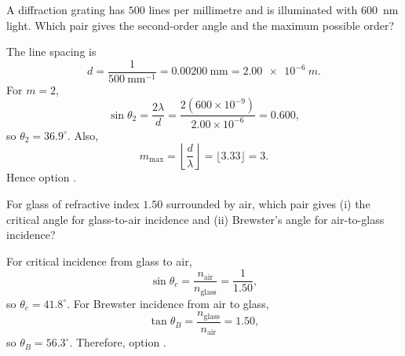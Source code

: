 \begin{quizquestion}[
  id=phy104-opt-038,
  topic=optics,
  difficulty=applied,
  marks=2,
  correct=D,
  tags={diffraction-grating,grating-equation,order-limit},
  outcome={Combine a grating angle calculation with the order limit}
]
  A diffraction grating has \(500\) lines per millimetre and is illuminated with \SI{600}{nm} light. Which pair gives the second-order angle and the maximum possible order?
\end{quizquestion}
\begin{quizsolution}
  The line spacing is
    \[
      d=\frac{1}{500\ \mathrm{mm}^{-1}}=0.00200\ \mathrm{mm}=\SI{2.00e-6}{m}.
    \]
    For \(m=2\),
    \[
      \sin\theta_2=\frac{2\lambda}{d}
      =\frac{2(600\times10^{-9})}{2.00\times10^{-6}}=0.600,
    \]
    so \(\theta_2=36.9^\circ\). Also,
    \[
      m_{\max}=\left\lfloor\frac{d}{\lambda}\right\rfloor
      =\lfloor3.33\rfloor=3.
    \]
    Hence option \textbf{\quizcorrectletter}.
\end{quizsolution}

\begin{quizquestion}[
  id=phy104-opt-039,
  topic=optics,
  difficulty=applied,
  marks=2,
  correct=A,
  tags={total-internal-reflection,brewster-angle,critical-angle},
  outcome={Calculate critical and Brewster angles}
]
  For glass of refractive index \(1.50\) surrounded by air, which pair gives (i) the critical angle for glass-to-air incidence and (ii) Brewster's angle for air-to-glass incidence?
\end{quizquestion}
\begin{quizsolution}
  For critical incidence from glass to air,
    \[
      \sin\theta_c=\frac{n_{\text{air}}}{n_{\text{glass}}}=\frac{1}{1.50},
    \]
    so \(\theta_c=41.8^\circ\). For Brewster incidence from air to glass,
    \[
      \tan\theta_B=\frac{n_{\text{glass}}}{n_{\text{air}}}=1.50,
    \]
    so \(\theta_B=56.3^\circ\). Therefore, option \textbf{\quizcorrectletter}.
\end{quizsolution}

